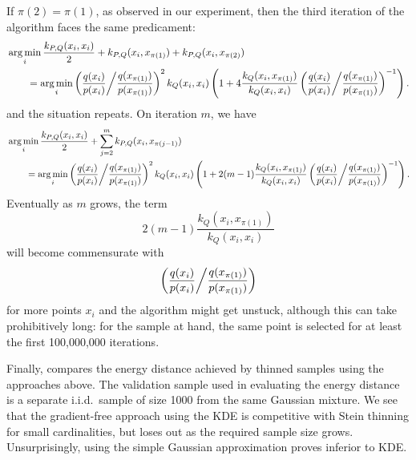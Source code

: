 \documentclass[11pt,a4paper]{report}
\DeclareMathOperator*{\argmin}{arg\,min}
\begin{document}
If $\pi(2) = \pi(1)$, as observed in our experiment, then the third iteration of the algorithm faces the same predicament:
\begin{equation*}
\begin{aligned}
&\argmin_i \frac{k_{P,Q}(x_i, x_i)}{2} + k_{P,Q}(x_i, x_{\pi(1)}) + k_{P,Q}(x_i, x_{\pi(2)})\\
&\qquad = \argmin_i \left(\frac{q(x_i)}{p(x_i)} \middle/ \frac{q(x_{\pi(1)})}{p(x_{\pi(1)})}\right)^2 k_Q(x_i, x_i) \left( 1 + 4 \frac{k_Q(x_i, x_{\pi(1)})}{k_Q(x_i, x_i)} \left(\frac{q(x_i)}{p(x_i)} \middle/ \frac{q(x_{\pi(1)})}{p(x_{\pi(1)})}\right)^{-1} \right).
\end{aligned}
\end{equation*}
and the situation repeats. 
On iteration $m$, we have
\begin{equation*}
\begin{aligned}
&\argmin_i \frac{k_{P,Q}(x_i, x_i)}{2} + \sum_{j=2}^m k_{P,Q}(x_i, x_{\pi(j-1)})\\
&\qquad = \argmin_i \left(\frac{q(x_i)}{p(x_i)} \middle/ \frac{q(x_{\pi(1)})}{p(x_{\pi(1)})}\right)^2 k_Q(x_i, x_i) \left( 1 + 2 (m - 1) \frac{k_Q(x_i, x_{\pi(1)})}{k_Q(x_i, x_i)} \left(\frac{q(x_i)}{p(x_i)} \middle/ \frac{q(x_{\pi(1)})}{p(x_{\pi(1)})}\right)^{-1} \right).
\end{aligned}
\end{equation*}
Eventually as $m$ grows, the term
\begin{equation*}
2 (m - 1) \frac{k_Q(x_i, x_{\pi(1)})}{k_Q(x_i, x_i)}
\end{equation*}
will become commensurate with
\begin{equation*}
\left(\frac{q(x_i)}{p(x_i)} \middle/ \frac{q(x_{\pi(1)})}{p(x_{\pi(1)})}\right)
\end{equation*}
for more points $x_i$ and the algorithm might get unstuck, although this can take prohibitively long: for the sample at hand, the same point is selected for at least the first 100,000,000 iterations.

Finally,  compares the energy distance achieved by thinned samples using the approaches above. The validation sample used in evaluating the energy distance is a separate i.i.d.\ sample of size 1000 from the same Gaussian mixture. We see that the gradient-free approach using the KDE is competitive with Stein thinning for small cardinalities, but loses out as the required sample size grows. Unsurprisingly, using the simple Gaussian approximation proves inferior to KDE.
\end{document}

